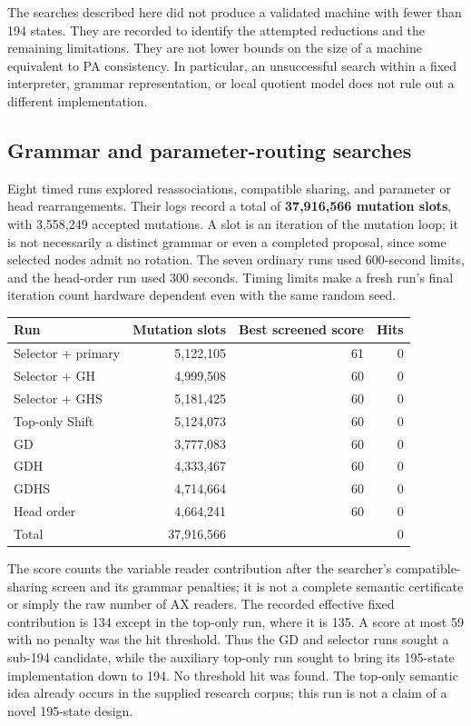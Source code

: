 \label{sec:bounded-searches}

The searches described here did not produce a validated machine with fewer
than 194 states.  They are recorded to identify the attempted reductions and
the remaining limitations.  They are not lower bounds on the size of a
machine equivalent to PA consistency.  In particular, an unsuccessful search
within a fixed interpreter, grammar representation, or local quotient model
does not rule out a different implementation.

\subsection{Grammar and parameter-routing searches}

Eight timed runs explored reassociations, compatible sharing, and parameter
or head rearrangements.  Their logs record a total of
\textbf{37,916,566 mutation slots}, with 3,558,249 accepted mutations.
A slot is an iteration of the mutation loop; it is not necessarily a distinct
grammar or even a completed proposal, since some selected nodes admit no
rotation.  The seven ordinary runs used 600-second limits, and the head-order
run used 300 seconds.  Timing limits make a fresh run's final iteration count
hardware dependent even with the same random seed.

\begin{center}
\begin{tabular}{lrrr}
\toprule
Run & Mutation slots & Best screened score & Hits\\
\midrule
Selector + primary & 5,122,105 & 61 & 0\\
Selector + GH & 4,999,508 & 60 & 0\\
Selector + GHS & 5,181,425 & 60 & 0\\
Top-only Shift & 5,124,073 & 60 & 0\\
GD & 3,777,083 & 60 & 0\\
GDH & 4,333,467 & 60 & 0\\
GDHS & 4,714,664 & 60 & 0\\
Head order & 4,664,241 & 60 & 0\\
\midrule
Total & 37,916,566 & & 0\\
\bottomrule
\end{tabular}
\end{center}

The score counts the variable reader contribution after the searcher's
compatible-sharing screen and its grammar penalties; it is not a complete
semantic certificate or simply the raw number of AX readers.  The recorded
effective fixed contribution is 134 except in the top-only run, where it is
135.  A score at most 59 with no penalty was the hit threshold.  Thus the
GD and selector runs sought a sub-194 candidate, while the auxiliary top-only
run sought to bring its 195-state implementation down to 194.  No threshold
hit was found.  The top-only semantic idea already occurs in the supplied
research corpus; this run is not a claim of a novel 195-state design.

